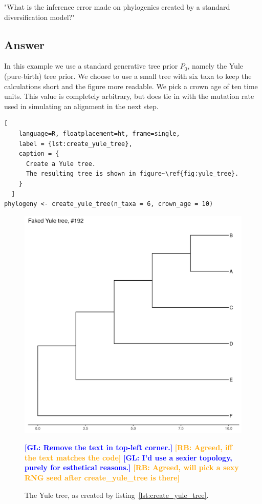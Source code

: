 \documentclass{article}
\newcommand{\giovanni}[1]{\textcolor{blue}{\textbf{[GL: #1]}}}
\newcommand{\richel}[1]{\textcolor{orange}{\textbf{[RB: #1]}}}
\begin{document}
"What is the inference error made on phylogenies
created by a standard diversification model?"

\subsection{Answer}

In this example we use a standard generative tree prior $\mathit{P_{0}}$, 
namely the Yule (pure-birth) tree prior. 
We choose to use a small tree with six taxa to keep
the calculations short and the figure more readable.
We pick a crown age of ten time units. This value is 
completely arbitrary, but does tie in with the mutation rate 
used in simulating an alignment in the next step.

\begin{lstlisting}[
    language=R, floatplacement=ht, frame=single, 
    label = {lst:create_yule_tree}, 
    caption = {
      Create a Yule tree. 
      The resulting tree is shown in figure~\ref{fig:yule_tree}.
    }
  ]
phylogeny <- create_yule_tree(n_taxa = 6, crown_age = 10)
\end{lstlisting}

\begin{figure}[ht]
  \includegraphics[width=\textwidth]{tree_yule.png}
  \caption{The Yule tree, as created by listing~\ref{lst:create_yule_tree}.}
  \label{fig:yule_tree}
  \giovanni{Remove the text in top-left corner.}
  \richel{Agreed, iff the text matches the code}
  \giovanni{I'd use a sexier topology, purely for esthetical reasons.}
  \richel{Agreed, will pick a sexy RNG seed after create\_yule\_tree is there}
\end{figure}
\end{document}

